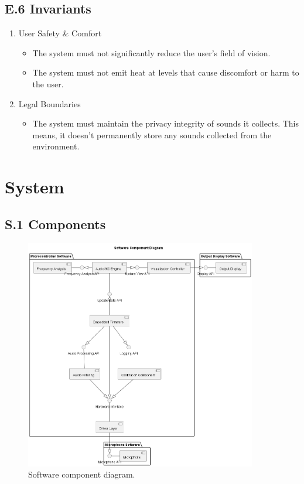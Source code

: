 \documentclass[12pt]{article}
\theoremstyle{definition}
\begin{document}
\subsection{E.6 Invariants}

\begin{enumerate}
  \item User Safety \& Comfort
  \begin{itemize}
    \item The system must not significantly reduce the user's field of vision. 
    \item The system must not emit heat at levels that cause discomfort or harm
    to the user. 
  \end{itemize}

  \item Legal Boundaries
  \begin{itemize}
    \item The system must maintain the privacy integrity of sounds it collects.
    This means, it doesn't permanently store any sounds collected from the
    environment. 
  \end{itemize}
\end{enumerate}

\section{System}

\subsection{S.1 Components}

\begin{figure}[H]     
    \centering 
    \includegraphics[width=0.9\textwidth]{diagrams/s1_component_diagram.png}
    \caption{Software component diagram.}
    \label{fig:software_component_diagram}
\end{figure}
\end{document}
